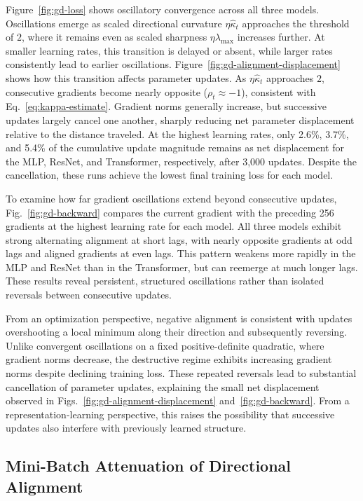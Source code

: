 Figure~\ref{fig:gd-loss} shows oscillatory convergence across all three models. Oscillations emerge as scaled directional curvature $\eta\widehat{\kappa}_t$ approaches the threshold of $2$, where it remains even as scaled sharpness $\eta\lambda_{\max}$ increases further. At smaller learning rates, this transition is delayed or absent, while larger rates consistently lead to earlier oscillations. Figure~\ref{fig:gd-alignment-displacement} shows how this transition affects parameter updates. As $\eta\widehat\kappa_t$ approaches $2$, consecutive gradients become nearly opposite ($\rho_t\approx-1$), consistent with Eq.~\eqref{eq:kappa-estimate}. Gradient norms generally increase, but successive updates largely cancel one another, sharply reducing net parameter displacement relative to the distance traveled. At the highest learning rates, only 2.6\%, 3.7\%, and 5.4\% of the cumulative update magnitude remains as net displacement for the MLP, ResNet, and Transformer, respectively, after 3,000 updates. Despite the cancellation, these runs achieve the lowest final training loss for each model.

To examine how far gradient oscillations extend beyond consecutive updates, Fig.~\ref{fig:gd-backward} compares the current gradient with the preceding 256 gradients at the highest learning rate for each model. All three models exhibit strong alternating alignment at short lags, with nearly opposite gradients at odd lags and aligned gradients at even lags. This pattern weakens more rapidly in the MLP and ResNet than in the Transformer, but can reemerge at much longer lags. These results reveal persistent, structured oscillations rather than isolated reversals between consecutive updates.

From an optimization perspective, negative alignment is consistent with updates overshooting a local minimum along their direction and subsequently reversing. Unlike convergent oscillations on a fixed positive-definite quadratic, where gradient norms decrease, the destructive regime exhibits increasing gradient norms despite declining training loss. These repeated reversals lead to substantial cancellation of parameter updates, explaining the small net displacement observed in Figs.~\ref{fig:gd-alignment-displacement} and~\ref{fig:gd-backward}. From a representation-learning perspective, this raises the possibility that successive updates also interfere with previously learned structure.

\subsection{Mini-Batch Attenuation of Directional Alignment}
\label{sec:sgd-noise-experiments}


